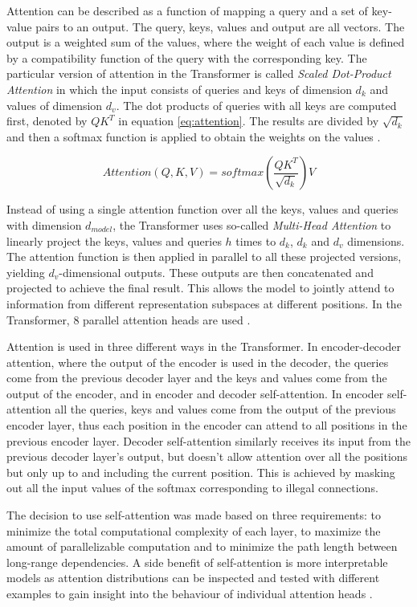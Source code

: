 Attention can be described as a function of mapping a query and a set of key-value pairs to an output.
The query, keys, values and output are all vectors.
The output is a weighted sum of the values, where the weight of each value is defined by a compatibility function of the query with the corresponding key.
The particular version of attention in the Transformer is called \textit{Scaled Dot-Product Attention} in which the input consists of queries and keys of dimension $d_k$ and values of dimension $d_v$.
The dot products of queries with all keys are computed first, denoted by $QK^T$ in equation \ref{eq:attention}.
The results are divided by $\sqrt{d_k}$ and then a softmax function is applied to obtain the weights on the values \cite{vaswani2017}.


\begin{equation}
  Attention(Q,K,V)=softmax(\dfrac{{QK^T}}{{\sqrt{d_k}}})V\label{eq:attention}
\end{equation}

Instead of using a single attention function over all the keys, values and queries with dimension $d_{model}$, the Transformer uses so-called \textit{Multi-Head Attention} to linearly project the keys, values and queries $h$ times to $d_k$, $d_k$ and $d_v$ dimensions.
The attention function is then applied in parallel to all these projected versions, yielding $d_v$-dimensional outputs.
These outputs are then concatenated and projected to achieve the final result.
This allows the model to jointly attend to information from different representation subspaces at different positions.
In the Transformer, 8 parallel attention heads are used \cite{vaswani2017}.

Attention is used in three different ways in the Transformer.
In encoder-decoder attention, where the output of the encoder is used in the decoder, the queries come from the previous decoder layer and the keys and values come from the output of the encoder, and in encoder and decoder self-attention.
In encoder self-attention all the queries, keys and values come from the output of the previous encoder layer, thus each position in the encoder can attend to all positions in the previous encoder layer.
Decoder self-attention similarly receives its input from the previous decoder layer's output, but doesn't allow attention over all the positions but only up to and including the current position.
This is achieved by masking out all the input values of the softmax corresponding to illegal connections.

The decision to use self-attention was made based on three requirements: to minimize the total computational complexity of each layer, to maximize the amount of parallelizable computation and to minimize the path length between long-range dependencies.
A side benefit of self-attention is more interpretable models as attention distributions can be inspected and tested with different examples to gain insight into the behaviour of individual attention heads \cite{vaswani2017}.

